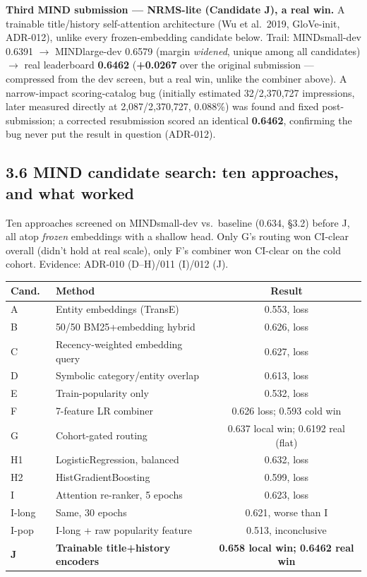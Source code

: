 \documentclass[10.5pt]{article}
\renewcommand{\arraystretch}{0.88}
\begin{document}
\textbf{Third MIND submission --- NRMS-lite (Candidate J), a real win.}
A trainable title/history self-attention architecture (Wu et al.\ 2019,
GloVe-init, ADR-012), unlike every frozen-embedding candidate below.
Trail: MINDsmall-dev 0.6391 $\to$ MINDlarge-dev 0.6579 (margin
\emph{widened}, unique among all candidates) $\to$ real leaderboard
\textbf{0.6462} (\textbf{+0.0267} over the original submission ---
compressed from the dev screen, but a real win, unlike the combiner above).
A narrow-impact scoring-catalog bug (initially estimated 32/2,370,727
impressions, later measured directly at 2,087/2,370,727, 0.088\%) was found
and fixed post-submission; a corrected resubmission scored an identical
\textbf{0.6462}, confirming the bug never put the result in question
(ADR-012).

\subsection*{3.6 MIND candidate search: ten approaches, and what worked}

Ten approaches screened on MINDsmall-dev vs.\ baseline (0.634, \S3.2)
before J, all atop \emph{frozen} embeddings with a shallow head. Only
G's routing won CI-clear overall (didn't hold at real scale), only F's
combiner won CI-clear on the cold cohort. Evidence: ADR-010 (D--H)/011 (I)/012 (J).

{\tiny
\renewcommand{\arraystretch}{0.75}
\begin{tabular}{@{}llc@{}}
\toprule
Cand.\ & Method & Result \\
\midrule
A & Entity embeddings (TransE) & 0.553, loss \\
B & 50/50 BM25+embedding hybrid & 0.626, loss \\
C & Recency-weighted embedding query & 0.627, loss \\
D & Symbolic category/entity overlap & 0.613, loss \\
E & Train-popularity only & 0.532, loss \\
F & 7-feature LR combiner & 0.626 loss; 0.593 cold win \\
G & Cohort-gated routing & 0.637 local win; 0.6192 real (flat) \\
H1 & LogisticRegression, balanced & 0.632, loss \\
H2 & HistGradientBoosting & 0.599, loss \\
I & Attention re-ranker, 5 epochs & 0.623, loss \\
I-long & Same, 30 epochs & 0.621, worse than I \\
I-pop & I-long + raw popularity feature & 0.513, inconclusive \\
\textbf{J} & \textbf{Trainable title+history encoders} & \textbf{0.658 local win; 0.6462 real win} \\
\bottomrule
\end{tabular}\par}
\end{document}
